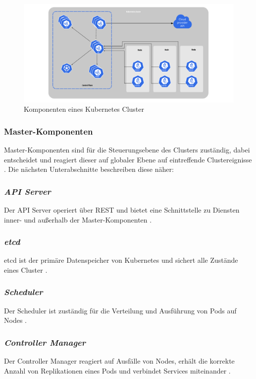 \begin{figure}
    \centering
    \includegraphics[width=1.0\columnwidth]{images/components-of-kubernetes.png}
    \caption{Komponenten eines Kubernetes Cluster \cite{kubernetesnodekomponenten}}
    \label{fig:cluster}
\end{figure}

\subsubsection{Master-Komponenten}
Master-Komponenten sind für die Steuerungsebene des Clusters zuständig,
dabei entscheidet und reagiert dieser auf globaler Ebene auf eintreffende Clustereignisse \cite{kuberneteskomponenten}.
Die nächsten Unterabschnitte beschreiben diese näher:

\subsubsection{\textit{API Server}}
Der API Server operiert über REST und bietet eine Schnittstelle zu Diensten
inner- und außerhalb der Master-Komponenten \cite{kuberneteskomponenten}.

\subsubsection{\textit{etcd}}
etcd ist der primäre Datenspeicher von Kubernetes und sichert alle Zustände eines
Cluster \cite{kuberneteskomponenten}.

\subsubsection{\textit{Scheduler}}
Der Scheduler ist zuständig für die Verteilung und Ausführung von Pods auf Nodes \cite{kuberneteskomponenten}.

\subsubsection{\textit{Controller Manager}}
Der Controller Manager reagiert auf Ausfälle von Nodes, erhält die korrekte
Anzahl von Replikationen eines Pods und verbindet Services miteinander \cite{kuberneteskomponenten}.

